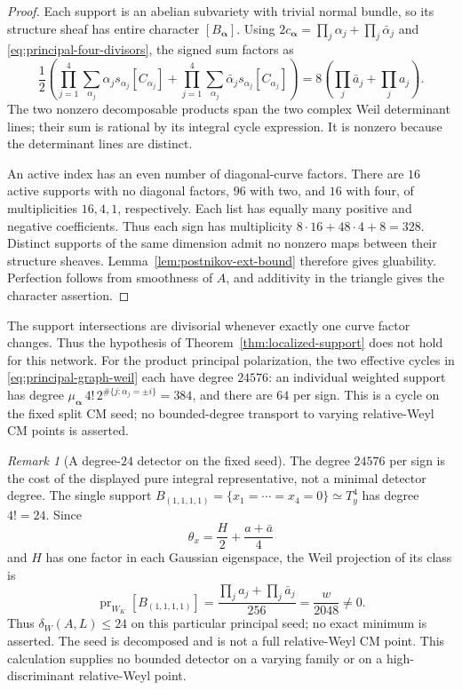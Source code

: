 \documentclass[11pt]{article}
\theoremstyle{definition}
\theoremstyle{remark}
\newtheorem{remark}[theorem]{Remark}
\begin{document}
\begin{proof}
Each support is an abelian subvariety with trivial normal bundle,
so its structure sheaf has entire character $[B_{\boldsymbol\alpha}]$.
Using $2c_{\boldsymbol\alpha}=
\prod_j\alpha_j+\prod_j\bar\alpha_j$ and
\eqref{eq:principal-four-divisors}, the signed sum factors as
\[
 \frac12\left(
  \prod_{j=1}^4\sum_{\alpha_j}\alpha_js_{\alpha_j}[C_{\alpha_j}]
  +\prod_{j=1}^4\sum_{\alpha_j}\bar\alpha_js_{\alpha_j}[C_{\alpha_j}]
 \right)
 =8\left(\prod_j\bar a_j+\prod_ja_j\right).
\]
The two nonzero decomposable products span the two complex Weil
determinant lines; their sum is rational by its integral cycle
expression.  It is nonzero because the determinant lines are
distinct.

An active index has an even number of diagonal-curve factors.
There are $16$ active supports with no diagonal factors, $96$ with
two, and $16$ with four, of multiplicities $16,4,1$, respectively.
Each list has equally many positive and negative coefficients.
Thus each sign has multiplicity
$8\cdot16+48\cdot4+8=328$.
Distinct supports of the same dimension admit no nonzero maps
between their structure sheaves.  Lemma~\ref{lem:postnikov-ext-bound}
therefore gives gluability.  Perfection follows from smoothness of
$A$, and additivity in the triangle gives the character assertion.
\end{proof}

The support intersections are divisorial whenever exactly one
curve factor changes.  Thus the hypothesis of
Theorem~\ref{thm:localized-support} does not hold for this network.
For the product principal polarization, the two effective cycles
in \eqref{eq:principal-graph-weil} each have degree $24576$:
an individual weighted support has degree
$\mu_{\boldsymbol\alpha}\,4!\,2^{\#\{j:\alpha_j=\pm i\}}
=384$, and there are $64$ per sign.
This is a cycle on the fixed split CM seed; no bounded-degree
transport to varying relative-Weyl CM points is asserted.

\begin{remark}[A degree-$24$ detector on the fixed seed]
\label{rem:principal-seed-small-detector}
The degree $24576$ per sign is the cost of the displayed pure
integral representative, not a minimal detector degree.
The single support
$B_{(1,1,1,1)}=\{x_1=\cdots=x_4=0\}\simeq T_y^4$ has degree
$4!=24$.  Since
\[
 \theta_x=\frac H2+\frac{a+\bar a}{4}
\]
and $H$ has one factor in each Gaussian eigenspace, the Weil
projection of its class is
\[
 \operatorname{pr}_{W_K}[B_{(1,1,1,1)}]
 =\frac{\prod_ja_j+\prod_j\bar a_j}{256}
 =\frac{w}{2048}\ne0.
\]
Thus $\delta_W(A,L)\leq24$ on this particular principal seed;
no exact minimum is asserted.  The seed is decomposed and is not
a full relative-Weyl CM point.  This calculation supplies no
bounded detector on a varying family or on a high-discriminant
relative-Weyl point.
\end{remark}
\end{document}
